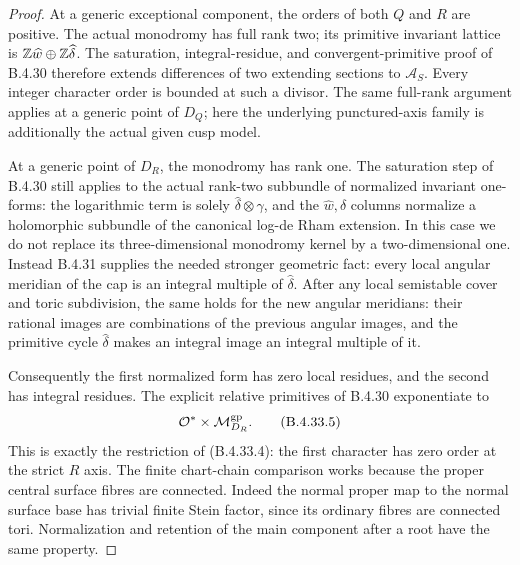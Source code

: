 \begin{proof}
At a generic exceptional component, the
orders of both $Q$ and $R$ are positive.
The actual monodromy has full rank two;
its primitive invariant lattice is
$\mathbb Z\widehat w\oplus\mathbb Z\widehat\delta$.
The saturation, integral-residue, and
convergent-primitive proof of B.4.30
therefore extends differences of two
extending sections to $\mathcal A_S$.
Every integer character order is bounded
at such a divisor. The same full-rank
argument applies at a generic point of
$D_Q$; here the underlying punctured-axis
family is additionally the actual given
cusp model.

At a generic point of $D_R$, the monodromy
has rank one. The saturation step of
B.4.30 still applies to the actual
rank-two subbundle of normalized invariant
one-forms:
the logarithmic term is solely
$\widehat\delta\otimes\gamma$, and the
$\widehat w,\widehat\delta$ columns
normalize a holomorphic subbundle of the
canonical log-de Rham extension. In this
case we do not replace its three-dimensional
monodromy kernel by a two-dimensional one.
Instead B.4.31 supplies the needed stronger
geometric fact: every local angular
meridian of the cap is an integral multiple
of $\widehat\delta$. After any local
semistable cover and toric subdivision,
the same holds for the new angular
meridians: their rational images are
combinations of the previous angular
images, and the primitive cycle
$\widehat\delta$ makes an integral image
an integral multiple of it.

Consequently the first normalized form
has zero local residues, and the second
has integral residues. The explicit
relative primitives of B.4.30 exponentiate
to
\[
             \mathcal O^*\times
                    \mathcal M_{D_R}^{\rm gp}.
 \tag{B.4.33.5}
\]
This is exactly the restriction of
(B.4.33.4): the first character has zero
order at the strict $R$ axis. The finite
chart-chain comparison works because the
proper central surface fibres are
connected. Indeed the normal proper map
to the normal surface base has trivial
finite Stein factor, since its ordinary
fibres are connected tori. Normalization
and retention of the main component after
a root have the same property.


\end{proof}
